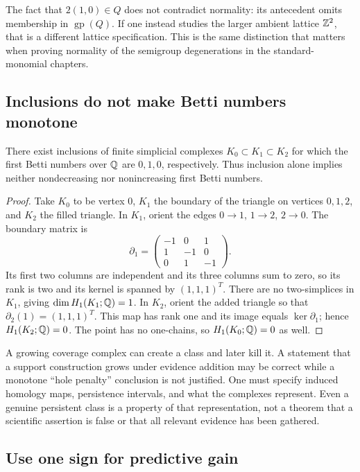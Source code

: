 The fact that $2(1,0)\in Q$ does not contradict normality: its antecedent
omits membership in $\operatorname{gp}(Q)$. If one instead studies the
larger ambient lattice $\mathbb{Z}^2$, that is a different lattice specification.
This is the same distinction that matters when proving normality of the
semigroup degenerations in the standard-monomial chapters.

\subsection{Inclusions do not make Betti numbers monotone}

\begin{proposition}
\label{qt:betti-counterexample}
There exist inclusions of finite simplicial complexes
$K_0\subset K_1\subset K_2$ for which the first Betti numbers over
$\mathbb{Q}$ are $0,1,0$, respectively. Thus inclusion alone implies neither
nondecreasing nor nonincreasing first Betti numbers.
\end{proposition}
\begin{proof}
Take $K_0$ to be vertex $0$, $K_1$ the boundary of the triangle on
vertices $0,1,2$, and $K_2$ the filled triangle. In $K_1$, orient the
edges $0\to1$, $1\to2$, $2\to0$. The boundary matrix is
\[
 \partial_1=
 \begin{pmatrix}-1&0&1\\1&-1&0\\0&1&-1\end{pmatrix}.
\]
Its first two columns are independent and its three columns sum to zero,
so its rank is two and its kernel is spanned by $(1,1,1)^T$.
There are no two-simplices in $K_1$, giving $\dim H_1(K_1;\mathbb{Q})=1$.
In $K_2$, orient the added triangle so that
$\partial_2(1)=(1,1,1)^T$. This map has rank one and its image equals
$\ker\partial_1$; hence $H_1(K_2;\mathbb{Q})=0$.
The point has no one-chains, so $H_1(K_0;\mathbb{Q})=0$ as well.
\end{proof}

A growing coverage complex can create a class and later kill it. A
statement that a support construction grows under evidence addition may
be correct while a monotone ``hole penalty'' conclusion is not justified.
One must specify induced homology maps, persistence intervals, and what
the complexes represent. Even a genuine persistent class is a property
of that representation, not a theorem that a scientific assertion is
false or that all relevant evidence has been gathered.

\subsection{Use one sign for predictive gain}

